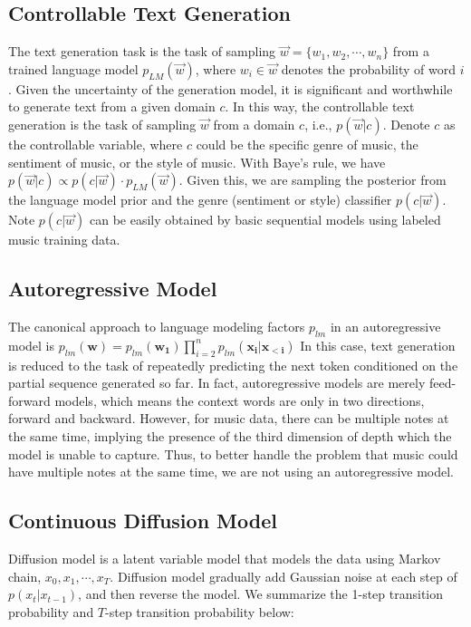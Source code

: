 \documentclass{article}
\begin{document}
\subsection{Controllable Text Generation}

The text generation task is the task of sampling $\vec{w} = \{w_1, w_2, \cdots, w_n\}$ from a trained language model $p_{LM}(\vec{w})$, where $w_i \in \vec{w}$ denotes the probability of word $i$. Given the uncertainty of the generation model, it is significant and worthwhile to generate text from a given domain $c$. In this way, the controllable text generation is the task of sampling $\vec{w}$ from a domain $c$, i.e., $p(\vec{w}|c)$. Denote $c$ as the controllable variable, where $c$ could be the specific genre of music, the sentiment of music, or the style of music. With Baye's rule, we have $p(\vec{w} | c) \propto p(c | \vec{w}) \cdot p_{LM}(\vec{w})$. Given this, we are sampling the posterior from the language model prior and the genre (sentiment or style) classifier $p(c | \vec{w})$. Note $p(c | \vec{w})$ can be easily obtained by basic sequential models using labeled music training data. 

\subsection{Autoregressive Model}

The canonical approach to language modeling factors $p_{lm}$ in an autoregressive model is $p_{lm}(\mathbf{w}) = p_{lm}(\mathbf{w_1}) \prod_{i=2}^{n} p_{lm}(\mathbf{x_i |x_{<i}}) $
In this case, text generation is reduced to the task of repeatedly predicting the next token conditioned on the partial sequence generated so far. In fact, autoregressive models are merely feed-forward models, which means the context words are only in two directions, forward and backward. However, for music data, there can be multiple notes at the same time, implying the presence of the third dimension of depth which the model is unable to capture. Thus, to better handle the problem that music could have multiple notes at the same time, we are not using an autoregressive model.

\subsection{Continuous Diffusion Model}

Diffusion model is a latent variable model that models the data using Markov chain, $x_0, x_1, \cdots, x_T$. Diffusion model gradually add Gaussian noise at each step of $p(x_t | x_{t-1})$, and then reverse the model. We summarize the 1-step transition probability and $T$-step transition probability below:
\end{document}
